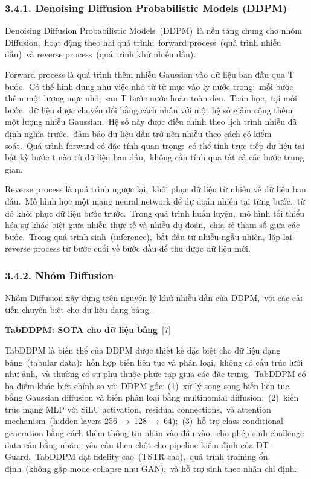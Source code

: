 \subsubsection{3.4.1. Denoising Diffusion Probabilistic Models (DDPM)}\label{denoising-diffusion-probabilistic-models-ddpm}

Denoising Diffusion Probabilistic Models~(DDPM)~là nền tảng chung cho nhóm Diffusion,~hoạt động theo hai quá trình:~forward process~(quá trình nhiễu dần)~và reverse process~(quá trình khử nhiễu dần).

Forward process là quá trình thêm nhiễu Gaussian vào dữ liệu ban đầu qua T bước.~Có thể hình dung như việc nhỏ từ từ mực vào ly nước trong:~mỗi bước thêm một lượng mực nhỏ,~sau T bước nước hoàn toàn đen.~Toán học,~tại mỗi bước,~dữ liệu được chuyển đổi bằng cách nhân với một hệ số giảm cộng thêm một lượng nhiễu Gaussian.~Hệ số này được điều chỉnh theo lịch trình nhiễu đã định nghĩa trước,~đảm bảo dữ liệu dần trở nên nhiễu theo cách có kiểm soát.~Quá trình forward có đặc tính quan trọng:~có thể tính trực tiếp dữ liệu tại bất kỳ bước t nào từ dữ liệu ban đầu,~không cần tính qua tất cả các bước trung gian.

Reverse process là quá trình ngược lại,~khôi phục dữ liệu từ nhiễu về dữ liệu ban đầu.~Mô hình học một mạng neural network để dự đoán nhiễu tại từng bước,~từ đó khôi phục dữ liệu bước trước.~Trong quá trình huấn luyện,~mô hình tối thiểu hóa sự khác biệt giữa nhiễu thực tế và nhiễu dự đoán,~chia sẻ tham số giữa các bước.~Trong quá trình sinh~(inference),~bắt đầu từ nhiễu ngẫu nhiên,~lặp lại reverse process từ bước cuối về bước đầu để thu được dữ liệu mới.

\subsubsection{3.4.2. Nhóm Diffusion}\label{nhuxf3m-diffusion}

Nhóm Diffusion xây dựng trên nguyên lý khử nhiễu dần của DDPM,~với các cải tiến chuyên biệt cho dữ liệu dạng bảng.

\textbf{TabDDPM: SOTA cho dữ liệu bảng}~{[}7{]}

TabDDPM là biến thể của DDPM được thiết kế đặc biệt cho dữ liệu dạng bảng~(tabular data):~hỗn hợp biến liên tục và phân loại,~không có cấu trúc lưới như ảnh,~và thường có sự phụ thuộc phức tạp giữa các đặc trưng.~TabDDPM có ba điểm khác biệt chính so với DDPM gốc: (1)~xử lý song song biến liên tục bằng Gaussian diffusion và biến phân loại bằng multinomial diffusion;~(2)~kiến trúc mạng MLP với SiLU activation,~residual connections,~và attention mechanism~(hidden layers 256~→~128~→~64);~(3)~hỗ trợ class-conditional generation bằng cách thêm thông tin nhãn vào đầu vào,~cho phép sinh challenge data cân bằng nhãn,~yêu cầu then chốt cho pipeline kiểm định của DT-Guard.~TabDDPM đạt fidelity cao~(TSTR cao),~quá trình training ổn định~(không gặp mode collapse như GAN),~và hỗ trợ sinh theo nhãn chỉ định.

